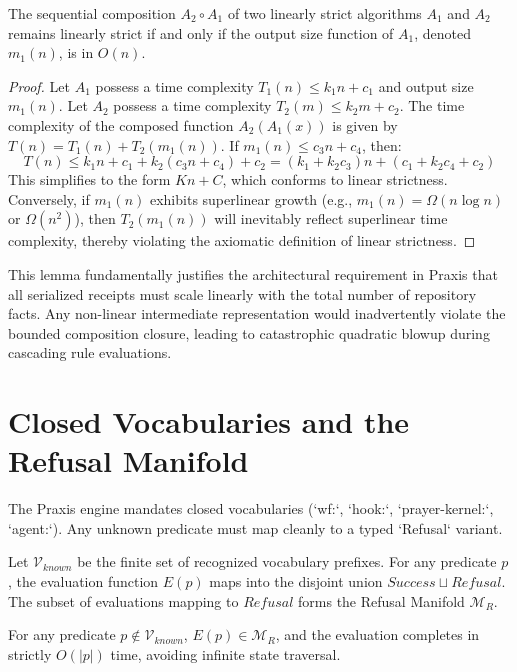 \begin{lemma}
\label{lem:linear_composition}
The sequential composition $A_2 \circ A_1$ of two linearly strict algorithms $A_1$ and $A_2$ remains linearly strict if and only if the output size function of $A_1$, denoted $m_1(n)$, is in $O(n)$.
\end{lemma}

\begin{proof}
Let $A_1$ possess a time complexity $T_1(n) \le k_1 n + c_1$ and output size $m_1(n)$. Let $A_2$ possess a time complexity $T_2(m) \le k_2 m + c_2$.
The time complexity of the composed function $A_2(A_1(x))$ is given by $T(n) = T_1(n) + T_2(m_1(n))$.
If $m_1(n) \le c_3 n + c_4$, then:
$$T(n) \le k_1 n + c_1 + k_2 (c_3 n + c_4) + c_2 = (k_1 + k_2 c_3) n + (c_1 + k_2 c_4 + c_2)$$
This simplifies to the form $K n + C$, which conforms to linear strictness.
Conversely, if $m_1(n)$ exhibits superlinear growth (e.g., $m_1(n) = \Omega(n \log n)$ or $\Omega(n^2)$), then $T_2(m_1(n))$ will inevitably reflect superlinear time complexity, thereby violating the axiomatic definition of linear strictness.
\end{proof}

This lemma fundamentally justifies the architectural requirement in Praxis that all serialized receipts must scale linearly with the total number of repository facts. Any non-linear intermediate representation would inadvertently violate the bounded composition closure, leading to catastrophic quadratic blowup during cascading rule evaluations.

\section{Closed Vocabularies and the Refusal Manifold}

The Praxis engine mandates closed vocabularies (`wf:`, `hook:`, `prayer-kernel:`, `agent:`). Any unknown predicate must map cleanly to a typed `Refusal` variant. 

\begin{definition}
Let $\mathcal{V}_{known}$ be the finite set of recognized vocabulary prefixes. For any predicate $p$, the evaluation function $E(p)$ maps into the disjoint union $Success \sqcup Refusal$. The subset of evaluations mapping to $Refusal$ forms the Refusal Manifold $\mathcal{M}_R$.
\end{definition}

\begin{theorem}
\label{thm:refusal_completeness}
For any predicate $p \notin \mathcal{V}_{known}$, $E(p) \in \mathcal{M}_R$, and the evaluation completes in strictly $O(|p|)$ time, avoiding infinite state traversal.
\end{theorem}

